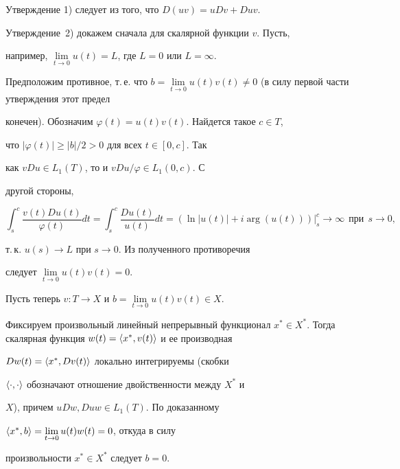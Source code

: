 \begin{pf}


Утверждение 1) следует из того, что $D(u v)=u D v + D u v$.


Утверждение~2) докажем сначала для скалярной функции $v$. Пусть,


например, $\lim\limits_{t\to 0}u(t)=L$, где $L=0$ или $L=\infty$.


Предположим противное, т.\,е. что $b=\lim\limits_{t\to


0}u(t)v(t) \ne 0$ (в силу первой части утверждения этот предел


конечен). Обозначим $\varphi(t)=u(t)v(t)$. Найдется такое $c \in T$,


что $|\varphi(t)| \ge |b|/2>0$ для всех $t \in [0,c]$. Так


как $v D u \in L_1(T)$, то и $v D u/\varphi \in L_1(0,c)$. С


другой стороны,


$$


\int_s^c \frac{v(t) D u(t)}{\varphi(t)} d t =


\int_s^c \frac{D u(t)}{u(t)} d t


=(\ln|u(t)|+i\arg(u(t)))|_s^c \to \infty \ \ \text{при} \ \ s \to0,


$$


т.\,к. $u(s) \to L$ при $s \to 0$. Из полученного противоречия


следует $\lim\limits_{t\to 0}u(t)v(t)=0$.





Пусть теперь $v:T \to X$ и $b=\lim\limits_{t\to 0}u(t)v(t) \in X$.


Фиксируем произвольный линейный непрерывный функционал $x^* \in


X^*$. Тогда скалярная функция $w(t)=\la x^* , v(t)\ra$ и ее производная


$D w(t)=\langle x^*,D v(t)\rangle$ локально интегрируемы (скобки


$\langle\cdot,\cdot\rangle$ обозначают отношение двойственности между $X^*$ и


$X$), причем $u D w, D u w \in L_1(T)$. По доказанному


$\langle x^*,b\rangle=\lim\limits_{t\to 0}u(t)w(t)=0$, откуда в силу


произвольности $x^* \in X^*$ следует $b=0$.


\end{pf}





